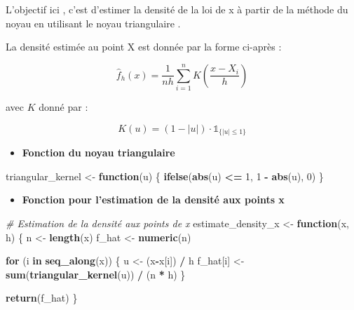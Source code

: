 \documentclass[
  12pt,
]{article}
\newenvironment{Shaded}{\begin{snugshade}}{\end{snugshade}}
\newcommand{\CommentTok}[1]{\textcolor[rgb]{0.56,0.35,0.01}{\textit{#1}}}
\newcommand{\ControlFlowTok}[1]{\textcolor[rgb]{0.13,0.29,0.53}{\textbf{#1}}}
\newcommand{\DecValTok}[1]{\textcolor[rgb]{0.00,0.00,0.81}{#1}}
\newcommand{\FunctionTok}[1]{\textcolor[rgb]{0.13,0.29,0.53}{\textbf{#1}}}
\newcommand{\NormalTok}[1]{#1}
\newcommand{\OtherTok}[1]{\textcolor[rgb]{0.56,0.35,0.01}{#1}}
\newcommand{\SpecialCharTok}[1]{\textcolor[rgb]{0.81,0.36,0.00}{\textbf{#1}}}
\providecommand{\tightlist}{%
  \setlength{\itemsep}{0pt}\setlength{\parskip}{0pt}}
\begin{document}
L'objectif ici , c'est d'estimer la densité de la loi de x à partir de
la méthode du noyau en utilisant le noyau triangulaire .

La densité estimée au point X est donnée par la forme ci-après :

\[
\hat{f}_h(x) = \frac{1}{n h} \sum_{i=1}^n K\left( \frac{x - X_i}{h} \right)
\]

avec \(K\) donné par :

\[
K(u) = (1 - |u|) \cdot \mathbb{1}_{\{|u| \leq 1\}}
\]

\begin{itemize}
\tightlist
\item
  \textbf{Fonction du noyau triangulaire}
\end{itemize}

\begin{Shaded}
\begin{Highlighting}[]
\NormalTok{triangular\_kernel }\OtherTok{\textless{}{-}} \ControlFlowTok{function}\NormalTok{(u) \{}
  \FunctionTok{ifelse}\NormalTok{(}\FunctionTok{abs}\NormalTok{(u) }\SpecialCharTok{\textless{}=} \DecValTok{1}\NormalTok{, }\DecValTok{1} \SpecialCharTok{{-}} \FunctionTok{abs}\NormalTok{(u), }\DecValTok{0}\NormalTok{)}
\NormalTok{\}}
\end{Highlighting}
\end{Shaded}

\begin{itemize}
\tightlist
\item
  \textbf{Fonction pour l'estimation de la densité aux points x}
\end{itemize}

\begin{Shaded}
\begin{Highlighting}[]
\CommentTok{\# Estimation de la densité aux points de x}
\NormalTok{estimate\_density\_x }\OtherTok{\textless{}{-}} \ControlFlowTok{function}\NormalTok{(x, h) \{}
\NormalTok{  n }\OtherTok{\textless{}{-}} \FunctionTok{length}\NormalTok{(x)}
\NormalTok{  f\_hat }\OtherTok{\textless{}{-}} \FunctionTok{numeric}\NormalTok{(n)}
  
  \ControlFlowTok{for}\NormalTok{ (i }\ControlFlowTok{in} \FunctionTok{seq\_along}\NormalTok{(x)) \{}
\NormalTok{    u }\OtherTok{\textless{}{-}}\NormalTok{ (x}\SpecialCharTok{{-}}\NormalTok{x[i]) }\SpecialCharTok{/}\NormalTok{ h}
\NormalTok{    f\_hat[i] }\OtherTok{\textless{}{-}} \FunctionTok{sum}\NormalTok{(}\FunctionTok{triangular\_kernel}\NormalTok{(u)) }\SpecialCharTok{/}\NormalTok{ (n }\SpecialCharTok{*}\NormalTok{ h)}
\NormalTok{  \}}
  
  \FunctionTok{return}\NormalTok{(f\_hat)}
\NormalTok{\}}
\end{Highlighting}
\end{Shaded}
\end{document}
